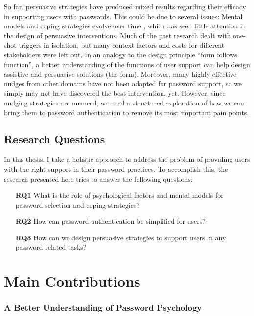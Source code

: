 So far, persuasive strategies have produced mixed results regarding their efficacy in supporting users with passwords. This could be due to several issues: Mental models and coping strategies evolve over time \cite{Stobert2014PasswordLifeCycle, Volkamer2013MentalModels}, which has seen little attention in the design of persuasive interventions. Much of the past research dealt with one-shot triggers in isolation, but many context factors and costs for different stakeholders were left out. In an analogy to the design principle ``form follows function'', a better understanding of the functions of user support can help design assistive and persuasive solutions (the form). Moreover, many highly effective nudges from other domains have not been adapted for password support, so we simply may not have discovered the best intervention, yet. However, since nudging strategies are nuanced, we need a structured exploration of how we can bring them to password authentication to remove its most important pain points.

\subsection{Research Questions}
In this thesis, I take a holistic approach to address the problem of providing users with the right support in their password practices. To accomplish this, the research presented here tries to answer the following questions:
\begin{itemize}
	\item[\textbf{RQ1}] What is the role of psychological factors and mental models for password selection and coping strategies?
	\item[\textbf{RQ2}] How can password authentication be simplified for users? 
	\item[\textbf{RQ3}] How can we design persuasive strategies to support users in any password-related tasks?
\end{itemize}

\section{Main Contributions}
\subsubsection{A Better Understanding of Password Psychology}

